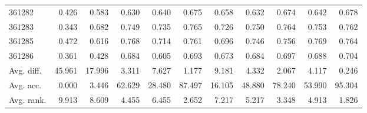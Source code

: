\begin{tabular}{lrrrrrrrrrr}
361282 & 0.426 & 0.583 & 0.630 & 0.640 & 0.675 & 0.658 & 0.632 & 0.674 & 0.642 & 0.678 \\
361283 & 0.343 & 0.682 & 0.749 & 0.735 & 0.765 & 0.726 & 0.750 & 0.764 & 0.753 & 0.762 \\
361285 & 0.472 & 0.616 & 0.768 & 0.714 & 0.761 & 0.696 & 0.746 & 0.756 & 0.769 & 0.764 \\
361286 & 0.361 & 0.428 & 0.684 & 0.605 & 0.693 & 0.673 & 0.684 & 0.697 & 0.688 & 0.704 \\
Avg. diff. & 45.961 & 17.996 & 3.311 & 7.627 & 1.177 & 9.181 & 4.332 & 2.067 & 4.117 & 0.246 \\
Avg. acc. & 0.000 & 3.446 & 62.629 & 28.480 & 87.497 & 16.105 & 48.880 & 78.240 & 53.990 & 95.304 \\
Avg. rank. & 9.913 & 8.609 & 4.455 & 6.455 & 2.652 & 7.217 & 5.217 & 3.348 & 4.913 & 1.826 \\
\bottomrule
\end{tabular}
